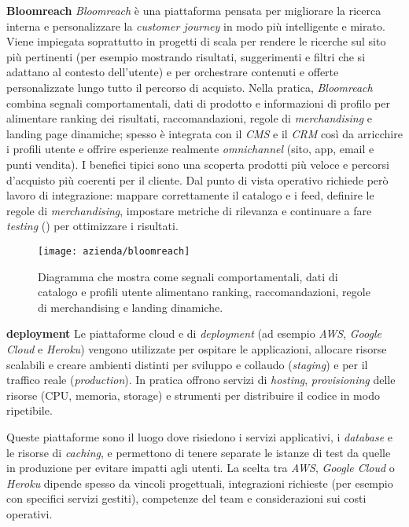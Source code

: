 \medskip
\noindent\textbf{Bloomreach}
\emph{Bloomreach} è una piattaforma pensata per migliorare la ricerca interna e personalizzare la \emph{customer journey} in modo più intelligente e mirato. 
Viene impiegata soprattutto in progetti di scala per rendere le ricerche sul sito più pertinenti (per esempio mostrando risultati, suggerimenti e filtri che si adattano al contesto dell’utente) 
e per orchestrare contenuti e offerte personalizzate lungo tutto il percorso di acquisto.
Nella pratica, \emph{Bloomreach} combina segnali comportamentali, dati di prodotto e informazioni di profilo per alimentare ranking dei risultati, raccomandazioni, 
regole di \emph{merchandising} e landing page dinamiche; spesso è integrata con il \emph{CMS} e il \emph{CRM} così da arricchire i profili utente e offrire esperienze 
realmente \emph{omnichannel} (sito, app, email e punti vendita).
I benefici tipici sono una scoperta prodotti più veloce e percorsi d’acquisto più coerenti per il cliente. Dal punto di vista operativo 
richiede però lavoro di integrazione: mappare correttamente il catalogo e i feed, definire le regole di \emph{merchandising}, impostare metriche di rilevanza e 
continuare a fare \emph{testing} () per ottimizzare i risultati.

\begin{figure}[htbp]
    \centering
    \texttt{[image: azienda/bloomreach]}
    \caption{Diagramma che mostra come segnali comportamentali, dati di catalogo e profili utente alimentano ranking, raccomandazioni, regole di merchandising e landing dinamiche.}
    \label{fig:bloomreach}
\end{figure}

\medskip
\noindent\textbf{deployment}
Le piattaforme cloud e di \emph{deployment} (ad esempio \emph{AWS}, \emph{Google Cloud} e \emph{Heroku}) vengono utilizzate per ospitare le applicazioni, 
allocare risorse scalabili e creare ambienti distinti per sviluppo e collaudo (\emph{staging}) e per il traffico reale (\emph{production}). 
In pratica offrono servizi di \emph{hosting}, \emph{provisioning} delle risorse (CPU, memoria, storage) e strumenti per distribuire il codice in modo ripetibile.

Queste piattaforme sono il luogo dove risiedono i servizi applicativi, i \emph{database} e le risorse di \emph{caching}, 
e permettono di tenere separate le istanze di test da quelle in produzione per evitare impatti agli utenti. La scelta tra \emph{AWS}, \emph{Google Cloud} o \emph{Heroku} 
dipende spesso da vincoli progettuali, integrazioni richieste (per esempio con specifici servizi gestiti), competenze del team e considerazioni sui costi operativi.

